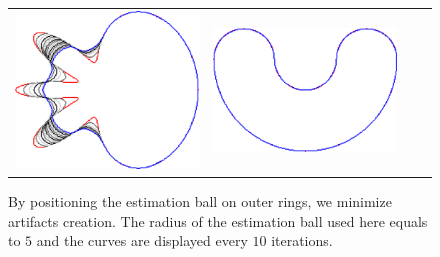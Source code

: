 \begin{figure}
\begin{tabular}{p{3em}ccc}
\includegraphics[scale=0.25]{figures/chapter6/level-effect/flower/improve/len_pen0/radius-5/level5/summary.pdf} &
\includegraphics[scale=0.25]{figures/chapter6/level-effect/bean/improve/len_pen0/radius-5/level5/summary.pdf} \\[2em]
\end{tabular}
\caption{By positioning the estimation ball on outer rings, we minimize artifacts creation. The radius of the estimation ball used here equals to $5$ and the curves are displayed every $10$ iterations. \label{fig:mrings-r5-evolution}}
\end{figure}


